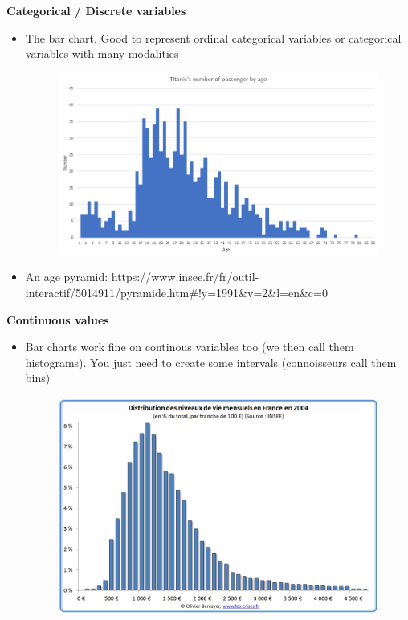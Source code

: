\documentclass[compress]{beamer}
\begin{document}
\begin{frame}
	\textbf{Categorical / Discrete variables}
	\begin{itemize}
		\item The bar chart. Good to represent ordinal categorical variables or categorical variables with many modalities 
		\begin{figure}
            \centering
            \includegraphics[scale=0.5]{Picture/Titanic bar chart passenger age.PNG}
        \end{figure}
		\item An age pyramid: https://www.insee.fr/fr/outil-interactif/5014911/pyramide.htm#!y=1991&v=2&l=en&c=0
	\end{itemize}
\end{frame}

\begin{frame}
	\textbf{Continuous values}
    \begin{itemize}
		\item Bar charts work fine on continous variables too (we then call them histograms). You just need to create some intervals (connoisseurs call them bins)
        \vspace{0.2cm}
        \begin{figure}
            \centering
            \includegraphics[scale=0.15]{Picture/distribution-niveaux-de-vie-mensuels.jpg}
        \end{figure}
    \end{itemize}
\end{frame}
\end{document}
